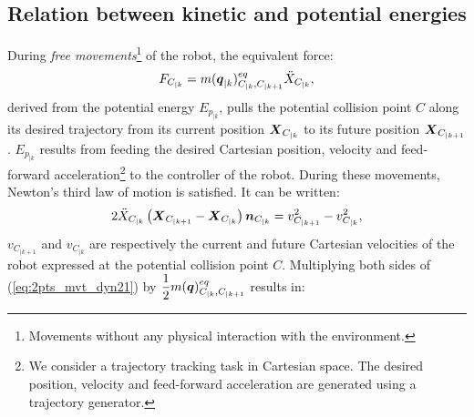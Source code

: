 \subsection{Relation between kinetic and potential energies}
\label{subsec:relEcEp}
During \textit{free movements}\footnote{Movements without any physical interaction with the environment.} of the robot, the equivalent force: 
\begin{equation}
F_{C_{|k}} = m(\mbox{\boldmath${q}$}_{|k})_{C_{|k},C_{|k+1}}^{eq} \ddot{X}_{C_{|k}},
\label{eq:pulling_force}
\end{equation}
derived from the potential energy $E_{p_{|k}}$, pulls the potential collision point $C$ along its desired trajectory from its current position $\mbox{\boldmath${X}$}_{C_{|k}}$ to its future position $\mbox{\boldmath${X}$}_{C_{|k+1}}$. $E_{p_{|k}}$ results from feeding the 
desired Cartesian position, velocity and feed-forward acceleration\footnote{We consider a trajectory tracking task in Cartesian space. The desired position, velocity and feed-forward acceleration are generated using a trajectory generator.} to the controller of the robot. During these movements, Newton's third law of motion is satisfied. It can be written:
\begin{equation}
2 \ddot{X}_{C_{|k}} \left(\mbox{\boldmath${X}$}_{C_{|k+1}} - \mbox{\boldmath${X}$}_{C_{|k}}\right) \mbox{\boldmath${n}$}_{C_{|k}} = v_{C_{|k+1}}^2 - v_{C_{|k}}^2,
\label{eq:2pts_mvt_dyn21}
\end{equation}
$v_{C_{|k+1}}$ and $v_{C_{|k}}$ are respectively the current and future Cartesian velocities of the robot expressed at the potential collision point $C$. Multiplying both sides of (\ref{eq:2pts_mvt_dyn21}) by $\dfrac{1}{2} m(\mbox{\boldmath${q}$})_{C_{|k},C_{|k+1}}^{eq}$ results in: 
